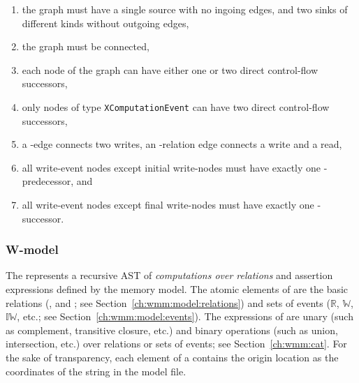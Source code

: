 \begin{enumerate}[noitemsep]
\item the graph must have a single source with no ingoing edges, and two sinks of different kinds without outgoing edges,
\item the graph must be connected,
\item each node of the graph can have either one or two direct control-flow successors,
\item only nodes of type \texttt{XComputationEvent} can have two direct control-flow successors,
\item a \co{}-edge connects two writes, an \rf{}-relation edge connects a write and a read,
\item all write-event nodes except initial write-nodes must have exactly one \co-predecessor, and
\item all write-event nodes except final write-nodes must have exactly one \co-successor.
\end{enumerate}





%

\subsubsection{W-model}
\label{ch:impl:model:wmodel}

The \textit{\wmodel{}} represents a recursive AST of \textit{computations over relations} and assertion expressions defined by the memory model.
The atomic elements of \wmodel{} are the basic relations (\po{}, \rf{} and \co{}; see Section~\ref{ch:wmm:model:relations}) and sets of events ($\mathbb{R}$, $\mathbb{W}$, $\mathbb{IW}$, etc.; see Section~\ref{ch:wmm:model:events}).
The expressions of \wmodel{} are unary (such as complement, transitive closure, etc.) and binary operations (such as union, intersection, etc.) over relations or sets of events; see Section~\ref{ch:wmm:cat}.
For the sake of transparency, each element of a \wmodel{} contains the origin location as the coordinates of the string in the model file. %

